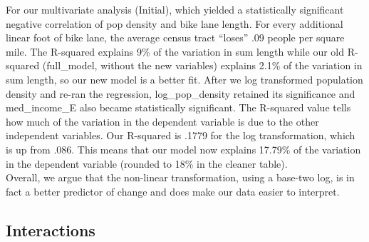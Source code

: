 \documentclass[
]{article}
\begin{document}
For our multivariate analysis (Initial), which yielded a statistically
significant negative correlation of pop density and bike lane length.
For every additional linear foot of bike lane, the average census tract
``loses'' .09 people per square mile. The R-squared explains 9\% of the
variation in sum length while our old R-squared (full\_model, without
the new variables) explains 2.1\% of the variation in sum length, so our
new model is a better fit. After we log transformed population density
and re-ran the regression, log\_pop\_density retained its significance
and med\_income\_E also became statistically significant. The R-squared
value tells how much of the variation in the dependent variable is due
to the other independent variables. Our R-squared is .1779 for the log
transformation, which is up from .086. This means that our model now
explains 17.79\% of the variation in the dependent variable (rounded to
18\% in the cleaner table).\\
Overall, we argue that the non-linear transformation, using a base-two
log, is in fact a better predictor of change and does make our data
easier to interpret.

\hypertarget{interactions}{%
\subsection{Interactions}\label{interactions}}

 
  \providecommand{\huxb}[2]{\arrayrulecolor[RGB]{#1}\global\arrayrulewidth=#2pt}
  \providecommand{\huxvb}[2]{\color[RGB]{#1}\vrule width #2pt}
  \providecommand{\huxtpad}[1]{\rule{0pt}{#1}}
  \providecommand{\huxbpad}[1]{\rule[-#1]{0pt}{#1}}
\end{document}
